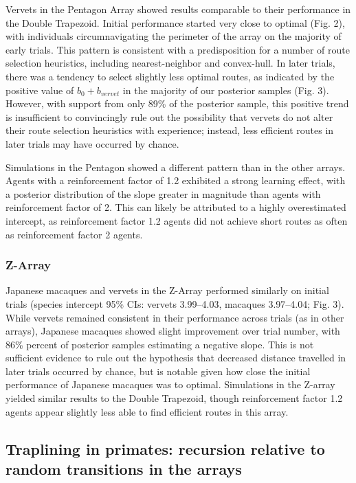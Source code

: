 \documentclass[twoside,12pt,final]{ucthesis-CA2012}
\begin{document}
\begin{ucmainmatter}
Vervets in the Pentagon Array showed results comparable to their performance in the Double Trapezoid. Initial performance started very close to optimal (Fig. 2), with individuals circumnavigating the perimeter of the array on the majority of early trials. This pattern is consistent with a predisposition for a number of route selection heuristics, including nearest-neighbor and convex-hull. In later trials, there was a tendency to select slightly less optimal routes, as indicated by the positive value of \(b_0+b_{vervet}\) in the majority of our posterior samples (Fig. 3). However, with support from only 89\% of the posterior sample, this positive trend is insufficient to convincingly rule out the possibility that vervets do not alter their route selection heuristics with experience; instead, less efficient routes in later trials may have occurred by chance.

Simulations in the Pentagon showed a different pattern than in the other arrays. Agents with a reinforcement factor of 1.2 exhibited a strong learning effect, with a posterior distribution of the slope greater in magnitude than agents with reinforcement factor of 2. This can likely be attributed to a highly overestimated intercept, as reinforcement factor 1.2 agents did not achieve short routes as often as reinforcement factor 2 agents.

\hypertarget{z-array}{%
\subsubsection{Z-Array}\label{z-array}}

Japanese macaques and vervets in the Z-Array performed similarly on initial trials (species intercept 95\% CIs: vervets 3.99--4.03, macaques 3.97--4.04; Fig. 3). While vervets remained consistent in their performance across trials (as in other arrays), Japanese macaques showed slight improvement over trial number, with 86\% percent of posterior samples estimating a negative slope. This is not sufficient evidence to rule out the hypothesis that decreased distance travelled in later trials occurred by chance, but is notable given how close the initial performance of Japanese macaques was to optimal. Simulations in the Z-array yielded similar results to the Double Trapezoid, though reinforcement factor 1.2 agents appear slightly less able to find efficient routes in this array.

\hypertarget{traplining-in-primates-recursion-relative-to-random-transitions-in-the-arrays}{%
\subsection{Traplining in primates: recursion relative to random transitions in the arrays}\label{traplining-in-primates-recursion-relative-to-random-transitions-in-the-arrays}}


\end{ucmainmatter}
\end{document}
